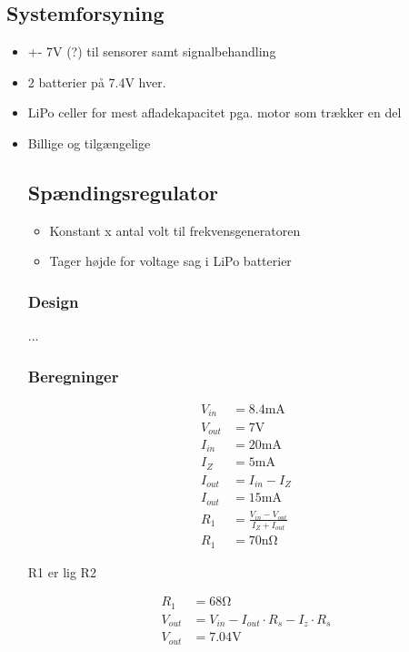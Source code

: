\subsection{Systemforsyning}
\begin{itemize}
	\item +- 7V (?) til sensorer samt signalbehandling
	\item 2 batterier på 7.4V hver. 
	\item LiPo celler for mest afladekapacitet pga. motor som trækker en del
	\item Billige og tilgængelige
	
\subsection{Spændingsregulator}
\begin{itemize}
	\item Konstant x antal volt til frekvensgeneratoren
	\item Tager højde for voltage sag i LiPo batterier
\end{itemize}

	
	\subsubsection{Design}
	...
	
	\subsubsection{Beregninger}
	
	\begin{align}
	V_{in} & = 8.4 \si{\milli\ampere} \nonumber \\
	V_{out} & = 7 \si{\volt} \nonumber \\
	I_{in} & = 20\si{\milli\ampere} \nonumber \\
	I_Z & = 5 \si{\milli\ampere} \nonumber \\
	I_{out} & = I_{in} - I_Z \\
	I_{out} & = 15 \si{\milli\ampere} \nonumber \\
	R_1 & = \frac{V_{in} - V_{out}}{I_Z + I_{out}} \label{eq:RegulatorModstand} \\
	R_1 & = 70 \si{\nano\ohm} \label{eq:RegulatorModstandBeregnet}
	\end{align}
	
	R1 er lig R2
	
	\begin{align}
	R_1 & = 68 \si{\ohm} \nonumber \\
	V_{out} & = V_{in} - I_{out} \cdot R_s - I_z \cdot R_s \label{eq:RegulatorUdgangsPotentiale} \\
	V_{out} & = 7.04 \si{\volt} \label{eq:RegulatorBeregnetPotentiale} 
	\end{align}
	
\end{itemize}


